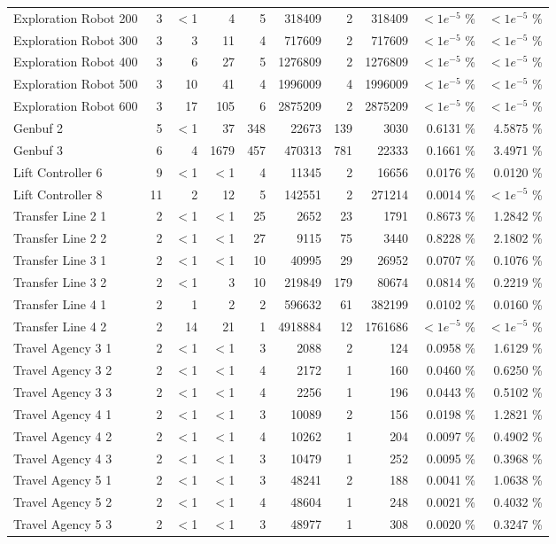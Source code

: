 \begin{tabular}{|l|r|rrr|rrr|rr|}
  Exploration Robot 200 &   3 & $<$1 & 4 & 5 & 318409 & 2 & 318409 & $<1e^{-5}$ \% & $<1e^{-5}$ \% \\ 
  Exploration Robot 300 &   3 & 3 & 11 & 4 & 717609 & 2 & 717609 & $<1e^{-5}$ \% & $<1e^{-5}$ \% \\ 
  Exploration Robot 400 &   3 & 6 & 27 & 5 & 1276809 & 2 & 1276809 & $<1e^{-5}$ \% & $<1e^{-5}$ \% \\ 
  Exploration Robot 500 &   3 & 10 & 41 & 4 & 1996009 & 4 & 1996009 & $<1e^{-5}$ \% & $<1e^{-5}$ \% \\ 
  Exploration Robot 600 &   3 & 17 & 105 & 6 & 2875209 & 2 & 2875209 & $<1e^{-5}$ \% & $<1e^{-5}$ \% \\ 
  Genbuf 2 &   5 & $<$1 & 37 & 348 & 22673 & 139 & 3030 &  0.6131 \% &    4.5875 \% \\ 
  Genbuf 3 &   6 & 4 & 1679 & 457 & 470313 & 781 & 22333 &  0.1661 \% &    3.4971 \% \\ 
  Lift Controller 6 &   9 & $<$1 & $<$1 & 4 & 11345 & 2 & 16656 &  0.0176 \% &    0.0120 \% \\ 
  Lift Controller 8 &  11 & 2 & 12 & 5 & 142551 & 2 & 271214 &  0.0014 \% & $<1e^{-5}$ \% \\ 
  Transfer Line 2 1 &   2 & $<$1 & $<$1 & 25 & 2652 & 23 & 1791 &  0.8673 \% &    1.2842 \% \\ 
  Transfer Line 2 2 &   2 & $<$1 & $<$1 & 27 & 9115 & 75 & 3440 &  0.8228 \% &    2.1802 \% \\ 
  Transfer Line 3 1 &   2 & $<$1 & $<$1 & 10 & 40995 & 29 & 26952 &  0.0707 \% &    0.1076 \% \\ 
  Transfer Line 3 2 &   2 & $<$1 & 3 & 10 & 219849 & 179 & 80674 &  0.0814 \% &    0.2219 \% \\ 
  Transfer Line 4 1 &   2 & 1 & 2 & 2 & 596632 & 61 & 382199 &  0.0102 \% &    0.0160 \% \\ 
  Transfer Line 4 2 &   2 & 14 & 21 & 1 & 4918884 & 12 & 1761686 & $<1e^{-5}$ \% & $<1e^{-5}$ \% \\ 
  Travel Agency 3 1 &   2 & $<$1 & $<$1 & 3 & 2088 & 2 & 124 &  0.0958 \% &    1.6129 \% \\ 
  Travel Agency 3 2 &   2 & $<$1 & $<$1 & 4 & 2172 & 1 & 160 &  0.0460 \% &    0.6250 \% \\ 
  Travel Agency 3 3 &   2 & $<$1 & $<$1 & 4 & 2256 & 1 & 196 &  0.0443 \% &    0.5102 \% \\ 
  Travel Agency 4 1 &   2 & $<$1 & $<$1 & 3 & 10089 & 2 & 156 &  0.0198 \% &    1.2821 \% \\ 
  Travel Agency 4 2 &   2 & $<$1 & $<$1 & 4 & 10262 & 1 & 204 &  0.0097 \% &    0.4902 \% \\ 
  Travel Agency 4 3 &   2 & $<$1 & $<$1 & 3 & 10479 & 1 & 252 &  0.0095 \% &    0.3968 \% \\ 
  Travel Agency 5 1 &   2 & $<$1 & $<$1 & 3 & 48241 & 2 & 188 &  0.0041 \% &    1.0638 \% \\ 
  Travel Agency 5 2 &   2 & $<$1 & $<$1 & 4 & 48604 & 1 & 248 &  0.0021 \% &    0.4032 \% \\ 
  Travel Agency 5 3 &   2 & $<$1 & $<$1 & 3 & 48977 & 1 & 308 &  0.0020 \% &    0.3247 \% \\ 
   \hline
\end{tabular}
